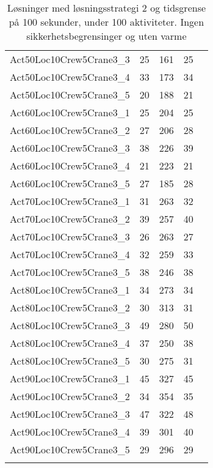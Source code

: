 {\begin{center}
\begin{longtable}{ | l | c | c | c | c | }
Act50Loc10Crew5Crane3\_3	&	25	&	161	&	25	\\
Act50Loc10Crew5Crane3\_4	&	33	&	173	&	34	\\
Act50Loc10Crew5Crane3\_5	&	20	&	188	&	21	\\
Act60Loc10Crew5Crane3\_1	&	25	&	204	&	25	\\
Act60Loc10Crew5Crane3\_2	&	27	&	206	&	28	\\
Act60Loc10Crew5Crane3\_3	&	38	&	226	&	39	\\
Act60Loc10Crew5Crane3\_4	&	21	&	223	&	21	\\
Act60Loc10Crew5Crane3\_5	&	27	&	185	&	28	\\
Act70Loc10Crew5Crane3\_1	&	31	&	263	&	32	\\
Act70Loc10Crew5Crane3\_2	&	39	&	257	&	40	\\
Act70Loc10Crew5Crane3\_3	&	26	&	263	&	27	\\
Act70Loc10Crew5Crane3\_4	&	32	&	259	&	33	\\
Act70Loc10Crew5Crane3\_5	&	38	&	246	&	38	\\
Act80Loc10Crew5Crane3\_1	&	34	&	273	&	34	\\
Act80Loc10Crew5Crane3\_2	&	30	&	313	&	31	\\
Act80Loc10Crew5Crane3\_3	&	49	&	280	&	50	\\
Act80Loc10Crew5Crane3\_4	&	37	&	250	&	38	\\
Act80Loc10Crew5Crane3\_5	&	30	&	275	&	31	\\
Act90Loc10Crew5Crane3\_1	&	45	&	327	&	45	\\
Act90Loc10Crew5Crane3\_2	&	34	&	354	&	35	\\
Act90Loc10Crew5Crane3\_3	&	47	&	322	&	48	\\
Act90Loc10Crew5Crane3\_4	&	39	&	301	&	40	\\
Act90Loc10Crew5Crane3\_5	&	29	&	296	&	29	\\
\hline							
\caption{Løsninger med løsningsstrategi 2 og tidsgrense på 100 sekunder, under 100 aktiviteter. Ingen sikkerhetsbegrensinger og uten varme}			
\label{tab:solutionUtenSikkerhetOgVarmeLS2Under100_100s}							
\end{longtable}				
\end{center}

}
